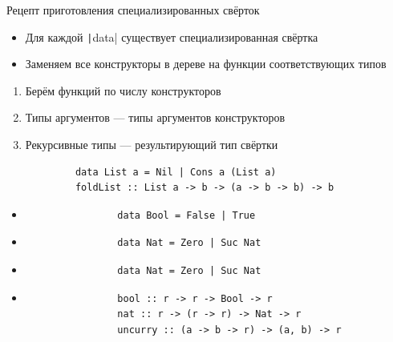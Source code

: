     \begin{frame}[fragile]{Рецепт приготовления специализированных свёрток}
        \begin{itemize}
            \item Для каждой \texttt|data| существует специализированная свёртка
            \item Заменяем все конструкторы в дереве на функции соответствующих типов
        \end{itemize}
        \begin{enumerate}
            \item Берём функций по числу конструкторов
            \item Типы аргументов --- типы аргументов конструкторов
            \item Рекурсивные типы --- результирующий тип свёртки
        \end{enumerate}
        \begin{verbatim}
            data List a = Nil | Cons a (List a)
            foldList :: List a -> b -> (a -> b -> b) -> b
        \end{verbatim}
        \begin{itemize}
            \item[\todo]
            \begin{verbatim}
                data Bool = False | True
            \end{verbatim}
            \item[\todo]
            \begin{verbatim}
                data Nat = Zero | Suc Nat
            \end{verbatim}
            \item[\todo]
            \begin{verbatim}
                data Nat = Zero | Suc Nat
            \end{verbatim}
            \item[\answer] \pause
            \begin{verbatim}
                bool :: r -> r -> Bool -> r
                nat :: r -> (r -> r) -> Nat -> r
                uncurry :: (a -> b -> r) -> (a, b) -> r
            \end{verbatim}
        \end{itemize}
    \end{frame}

